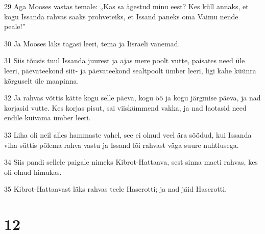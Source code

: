 \par 29 Aga Mooses vastas temale: „Kas sa ägestud minu eest? Kes küll annaks, et kogu Issanda rahvas saaks prohveteiks, et Issand paneks oma Vaimu nende peale!”
\par 30 Ja Mooses läks tagasi leeri, tema ja Iisraeli vanemad.
\par 31 Siis tõusis tuul Issanda juurest ja ajas mere poolt vutte, paisates need üle leeri, päevateekond siit- ja päevateekond sealtpoolt ümber leeri, ligi kahe küünra kõrguselt üle maapinna.
\par 32 Ja rahvas võttis kätte kogu selle päeva, kogu öö ja kogu järgmise päeva, ja nad korjasid vutte. Kes korjas pisut, sai viiskümmend vakka, ja nad laotasid need endile kuivama ümber leeri.
\par 33 Liha oli neil alles hammaste vahel, see ei olnud veel ära söödud, kui Issanda viha süttis põlema rahva vastu ja Issand lõi rahvast väga suure nuhtlusega.
\par 34 Siis pandi sellele paigale nimeks Kibrot-Hattaava, sest sinna maeti rahvas, kes oli olnud himukas.
\par 35 Kibrot-Hattaavast läks rahvas teele Haserotti; ja nad jäid Haserotti.

\chapter{12}

